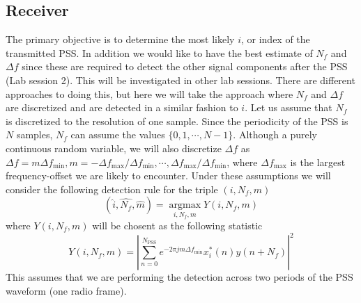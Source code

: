 \documentclass[a4paper,10pt]{article}
\begin{document}
\subsection{Receiver}
The primary objective is to determine the most likely $i$, or index of the transmitted PSS. In addition we would like to have the best estimate of $N_f$ and $\Delta f$ since these are required to detect the other signal components after the PSS (Lab session 2).  This will be investigated in other lab sessions.  There are different approaches to doing this, but here we will take the approach where $N_f$ and $\Delta f$ are discretized and are detected in a similar fashion to $i$.  Let us assume that $N_f$ is discretized to the resolution of one sample. Since the periodicity of the PSS is $N$ samples, $N_f$ can assume the values $\{0,1,\cdots,N-1\}$.  Although a purely continuous random variable, we will also discretize $\Delta f$ as $\Delta f = m\Delta f_\mathrm{min},m=-\Delta f_\mathrm{max}/\Delta f_\mathrm{min},\cdots,\Delta f_\mathrm{max}/\Delta f_ \mathrm{min}$, where $\Delta f_\mathrm{max}$ is the largest frequency-offset we are likely to encounter.  Under these assumptions we will consider the following detection rule for the triple $(i,N_f,m)$
\begin{equation*}
(\hat{i},\hat{N_f},\hat{m}) = \underset{i,N_f,m}{\operatorname{argmax}} Y(i,N_f,m)
\end{equation*}
where $Y(i,N_f,m)$ will be chosent as the following statistic
\begin{equation*}
Y(i,N_f,m) = \left|\sum_{n=0}^{N_\mathrm{PSS}} e^{-2\pi j m\Delta f_\mathrm{min}}x_i^*(n)y(n+N_f)\right|^2
\end{equation*}
This assumes that we are performing the detection across two periods of the PSS waveform (one radio frame).
\end{document}

